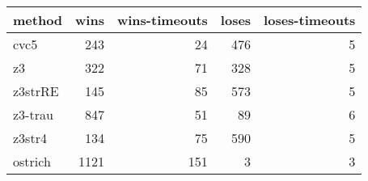 \begin{tabular}{lrrrr}
\hline
 method   &   wins &   wins-timeouts &   loses &   loses-timeouts \\
\hline
 cvc5     &    243 &              24 &     476 &                5 \\
 z3       &    322 &              71 &     328 &                5 \\
 z3strRE  &    145 &              85 &     573 &                5 \\
 z3-trau  &    847 &              51 &      89 &                6 \\
 z3str4   &    134 &              75 &     590 &                5 \\
 ostrich  &   1121 &             151 &       3 &                3 \\
\hline
\end{tabular}
